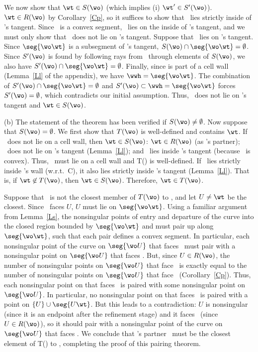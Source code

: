 We now show that $\wt \in S(\wo)$ (which implies (i) $\wt ' \in S'(\wo)$).
$\wt \in R(\wo)$ by Corollary~\ref{Cp},
so it suffices to show that \wt\ lies strictly inside of \wo's tangent.
Since \wwa\ is a convex segment, \wt\ lies on the inside of \wo's 
tangent, and we must only show that \wt\ does not lie on \wo's tangent.
Suppose that \wt\ lies on \wo's tangent.
Since $\seg{\wo\wt}$ is a subsegment of \wo's tangent,
$S(\wo) \cap \seg{\wo\wt} = \emptyset$.  
Since $S'(\wo)$ is found
by following rays from \wo\ through elements of $S(\wo)$,
we also have $S'(\wo) \cap \seg{\wo\wt} = \emptyset$.
Finally, since \seg{\wo\wt} is part of a cell wall (Lemma~\ref{Ll} of the appendix),
we have $\wwh = \seg{\wo\wt}$.
The combination of $S'(\wo) \cap \seg{\wo\wt} = \emptyset$ and
$S'(\wo) \subset \wwh = \seg{\wo\wt}$ forces $S'(\wo) = \emptyset$, which
contradicts our initial assumption.
Thus, \wt\ does not lie on \wo's tangent and $\wt \in S(\wo)$.

(b) The statement of the theorem has been verified if $S(\wo) \neq \emptyset$.
Now suppose that $S(\wo) = \emptyset$.
We first show that $T(\wo)$ is well-defined and contains $\wt$.
If \wo\ does not lie on a cell wall,
then $\wt \in S(\wo)$:
$\wt \in R(\wo)$ (as \wo's partner);
\wt\ does not lie on \wo's tangent (Lemma~\ref{Ll});
and \wt\ lies inside \wo's tangent (because \wwa\ is convex).  
Thus, \wo\ must lie on a cell wall and T(\wo) is well-defined.
If \wt\ lies strictly inside \wo's wall (w.r.t.\ C), it also lies strictly
inside \wo's tangent (Lemma~\ref{Ll}).
That is, if $\wt \not \in T(\wo)$, then $\wt \in S(\wo)$.
Therefore, $\wt \in T(\wo)$.

Suppose that \wt\ is not the closest member of $T(\wo)$ to \wo, and let 
\mbox{$U \neq \wt$} be the closest.  
Since \wo\ faces $U$, $U$ must lie on $\seg{\wo\wt}$.
Using a familiar argument from Lemma~\ref{Ls}, the nonsingular points of entry
and departure of the curve into the closed region bounded by $\seg{\wo\wt}$
and \arc{\wo\wt} must pair up along $\seg{\wo\wt}$, such that each pair
defines a convex segment.
In particular, each nonsingular point of the curve on $\seg{\wo U}$ 
that faces \wo\ must pair with a nonsingular point on $\seg{\wo U}$ that faces \wt.
But, 
since $U \in R(\wo)$, the number of nonsingular points on $\seg{\wo U}$ that face \wt\ is
exactly 
equal to the number of nonsingular points on $\seg{\wo U}$ that face \wo\ 
(Corollary~\ref{Cp}).
Thus, each nonsingular point on  that faces \wt\ is paired with 
some nonsingular point on $$.
In particular, no nonsingular point on \seg{\wo U} that faces \wt\ is paired with
a point on $\{U\} \cup \seg{U\wt}$.
But this leads to a contradiction:
$U$ is nonsingular (since it is an endpoint after the refinement stage)
and it faces \wo\ (since $U \in R(\wo)$), so it should
pair with a nonsingular point of the curve on $\seg{\wo U}$ that faces \wt.
We conclude that \wo's partner \wt\ must be the 
closest element of T(\wo) to \wo, completing the proof of this pairing theorem.
\QED

